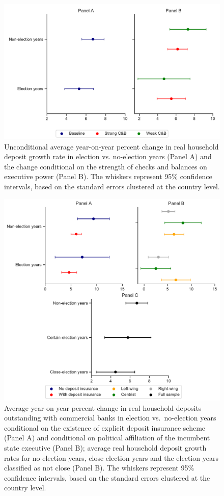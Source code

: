 \documentclass[12pt,a4paper]{article}
\begin{document}
\begin{figure}[ht]
	\centering
	\includegraphics[scale=0.8]{../output/plots/res1.pdf}
	\caption{Unconditional average year-on-year percent change in real household deposit growth rate in election vs. no-election years (Panel A) and the change conditional on the strength of checks and balances on executive power (Panel B). The whiskers represent 95\% confidence intervals, based on the standard errors clustered at the country level.}
	\label{visualresults}
\end{figure}

\begin{figure}[!ht]
	\centering
	\includegraphics[scale=0.8]{../output/plots/res2.pdf}
	\caption{Average year-on-year percent change in real household deposits outstanding with commercial banks in election vs.\ no-election years conditional on the existence of explicit deposit insurance scheme (Panel A) and conditional on political affiliation of the incumbent state executive (Panel B); average real household deposit growth rates for no-election years, close election years and the election years classified as not close (Panel B). The whiskers represent 95\% confidence intervals, based on the standard errors clustered at the country level.}
	\label{visualresults2}
\end{figure}
\end{document}

